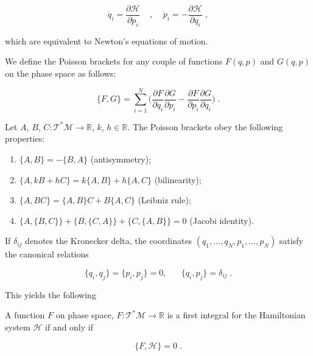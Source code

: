 \begin{equation}
\dot q_i = \frac{\partial \mathcal{H}}{\partial p_i}\;\;\;\;, \;\;\;\;
\dot p_i = - \frac{\partial \mathcal{H}}{\partial q_i}\;,
\end{equation}

which are equivalent to Newton's equations of motion. 

\begin{defi}
We define the Poisson brackets for any couple of functions $F(q,p)$ and $G(q,p)$ on the phase space as follows:

\begin{equation}
    \{F, G\} = \sum_{i=1}^N \Big (\frac{\partial F}{\partial q_i}\frac{\partial G}{\partial p_i} - \frac{\partial F}{\partial p_i}\frac{\partial G}{\partial q_i} \Big )\;.
\end{equation}
\end{defi}

\begin{prop}
Let $A$, $B$, $C: \mathcal{T}^\ast \mathcal{M} \to \mathbb{R}$, $k$, $h \in \mathbb{R}$. The Poisson brackets obey the following properties:

\begin{enumerate}
\item $\{A, B\} = - \{B, A\}$ (antisymmetry);
\item $\{A, kB + hC\} = k\{A, B\} + h\{A, C\}$ (bilinearity);
\item $\{A, BC \} = \{A, B\}C + B\{A, C \}$ (Leibniz rule);
\item $\{A, \{B, C \}\} + \{B, \{C ,A\}\} + \{C , \{A, B\}\} = 0$ (Jacobi identity).
\end{enumerate}
\end{prop}

If $\delta_{ij}$ denotes the Kronecker delta, the coordinates $(q_1, \dots, q_N, p_1, \dots, p_N)$ satisfy the canonical relations

\begin{equation}
    \{q_i, q_j\} = \{p_i, p_j\} = 0, \;\;\;\;\;\; \{q_i, p_j\} = \delta_{ij}\;.
\end{equation}

This yields the following

\begin{thm}
A function $F$ on phase space, $F:\mathcal{T}^\ast\mathcal{M} \to \mathbb{R}$ is a first integral for the Hamiltonian system $\mathcal{H}$ if and only if 

\begin{equation}
    \{F, \mathcal{H}\} = 0\;.
\end{equation}
\end{thm}

